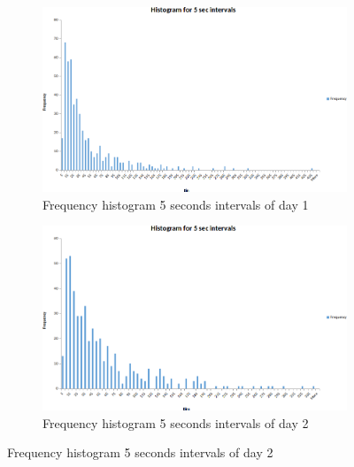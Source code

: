 \documentclass{article}
\begin{document}
\begin{figure}[H]
    \begin{subfigure}{0.5\textwidth}
        \includegraphics[width=\linewidth]{day1-hist-5sec.png}
        \caption{Frequency histogram 5 seconds intervals of day 1}
    \end{subfigure}
    \begin{subfigure} {0.5\textwidth}
        \includegraphics[width=\linewidth]{day2-hist-5sec.png}
        \caption{Frequency histogram 5 seconds intervals of day 2}
    \end{subfigure}
\end{figure}
\end{document}

